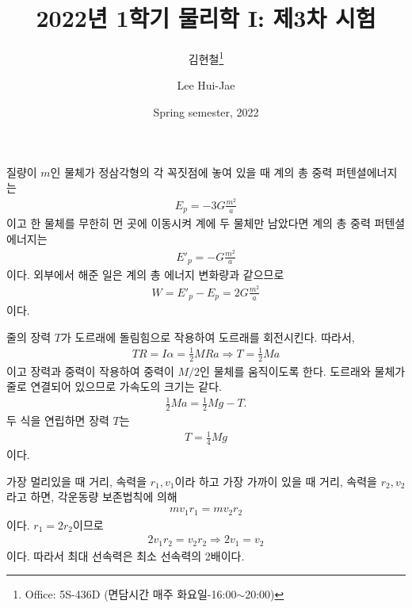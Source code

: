\documentclass[floatfix,nofootinbib,superscriptaddress,fleqn]{revtex4-2}
\begin{document}
\title{\Large 2022년 1학기 물리학 I: 제3차 시험}
\author{김현철\footnote{Office: 5S-436D (면담시간 매주
    화요일-16:00$\sim$20:00)}} 
\author{Lee Hui-Jae} 
\date{Spring semester, 2022}


\maketitle
 
질량이 $m$인 물체가 정삼각형의 각 꼭짓점에 놓여 있을 때 계의 총 중력 퍼텐셜에너지는
\begin{align}
  E_p =-3G\frac{m^2}{a}
\end{align} 
이고 한 물체를 무한히 먼 곳에 이동시켜 계에 두 물체만 남았다면 계의 총 중력 퍼텐셜에너지는
\begin{align}
  E'_p = -G\frac{m^2}{a}
\end{align}
이다. 외부에서 해준 일은 계의 총 에너지 변화량과 같으므로
\begin{align}
  W = E'_p - E_p = 2G\frac{m^2}{a}
\end{align}
이다.
 

\vspace{0.5cm} 
줄의 장력 $T$가 도르래에 돌림힘으로 작용하여 도르래를 회전시킨다. 따라서,
\begin{align}
  TR = I\alpha = \frac{1}{2}MRa \Longrightarrow T =\frac{1}{2}Ma
\end{align}    
이고 장력과 중력이 작용하여 중력이 $M/2$인 물체를 움직이도록 한다.
도르래와 물체가 줄로 연결되어 있으므로 가속도의 크기는 같다.
\begin{align}
  \frac{1}{2}Ma = \frac{1}{2}Mg - T.
\end{align}
두 식을 연립하면 장력 $T$는
\begin{align}
  T = \frac{1}{4}Mg
\end{align}
이다.

 

\vspace{0.5cm} 
가장 멀리있을 때 거리, 속력을 $r_1, v_1$이라 하고
가장 가까이 있을 때 거리, 속력을 $r_2, v_2$라고 하면,
각운동량 보존법칙에 의해 
\begin{align}
  mv_1r_1 = mv_2r_2
\end{align}
이다. $r_1 = 2r_2$이므로
\begin{align}
  2v_1r_2 = v_2r_2\Longrightarrow 2v_1 = v_2
\end{align}
이다. 따라서 최대 선속력은 최소 선속력의 2배이다.
\end{document}
